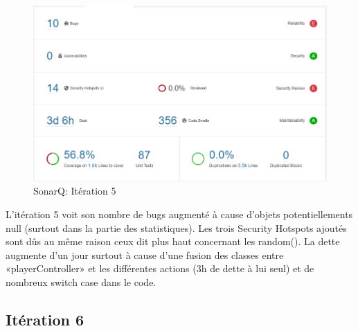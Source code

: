 \documentclass[13pt ,a4paper ]{report}
\begin{document}
\begin{multicols}{2}
      	\paragraph{}
        \begin{figure}[H]
      	\begin{center}
			\includegraphics[scale=0.3]{5.png}
			\caption{SonarQ: Itération 5}
		\end{center}
		\end{figure}
L’itération 5 voit son nombre de bugs augmenté à cause d’objets potentiellements null (surtout dans la partie des statistiques). Les trois Security Hotspots ajoutés sont dûs au même raison ceux dit plus haut concernant les random().
La dette augmente d’un jour surtout à cause d’une fusion des classes entre «playerController» et les différentes actions (3h de dette à lui seul) et de nombreux switch case dans le code. 

  		\subsection{Itération 6}

\end{multicols}
\end{document}
